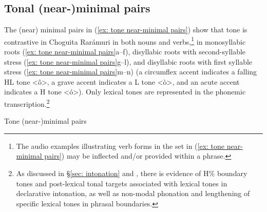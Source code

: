 \subsection{Tonal (near-)minimal pairs}
\label{subsec: minimal pairs}

The (near) minimal pairs in (\ref{ex: tone near-minimal pairs}) show that tone is contrastive in Choguita Rarámuri in both nouns and verbs,\footnote{The audio examples illustrating verb forms in the set in (\ref{ex: tone near-minimal pairs}) may be inflected and/or provided within a phrase.} in monosyllabic roots (\ref{ex: tone near-minimal pairs}a--f), disyllabic roots with second-syllable stress (\ref{ex: tone near-minimal pairs}g--l), and disyllabic roots with first syllable stress (\ref{ex: tone near-minimal pairs}m--n) (a circumflex accent indicates a falling HL tone <ô>, a grave accent indicates a L tone <ò>, and an acute accent indicates a H tone <ó>). Only lexical tones are represented in the phonemic transcription.\footnote{As discussed in §\ref{sec: intonation} and , there is evidence of H\% boundary tones and post-lexical tonal targets associated with lexical tones in declarative intonation, as well as non-modal phonation and lengthening of specific lexical tones in phrasal boundaries.}

\ea\label{ex: tone near-minimal pairs}
{Tone (near-)minimal pairs}

